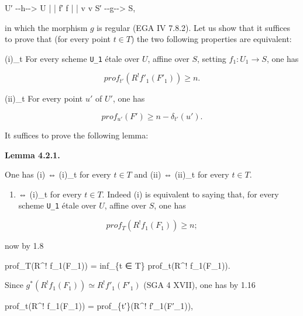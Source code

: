 \documentclass[
  11pt,
  a4paper,
]{book}
\newenvironment{Shaded}{}{}
\newcommand{\NormalTok}[1]{#1}
\providecommand{\tightlist}{%
  \setlength{\itemsep}{0pt}\setlength{\parskip}{0pt}}
\begin{document}
\begin{Shaded}
\begin{Highlighting}[]
\NormalTok{U′ {-}{-}h{-}{-}\textgreater{} U}
\NormalTok{|         |}
\NormalTok{f′        f}
\NormalTok{|         |}
\NormalTok{v         v}
\NormalTok{S′ {-}{-}g{-}{-}\textgreater{} S,}
\end{Highlighting}
\end{Shaded}

in which the morphism \(g\) is regular (EGA IV 7.8.2). Let us show that
it suffices to prove that (for every point \(t \in
T\)) the two following properties are equivalent:

(i)\_t For every scheme \texttt{U\_1} étale over \(U\), affine over
\(S\), setting \(f_{1} : U_{1} \to S\), one has

\[ prof_{t'}(R^{!} f'_{1}(F'_{1})) \geqslant n. \]

(ii)\_t For every point \(u'\) of \(U'\), one has

\[ prof_{u'}(F') \geqslant n - \delta_{t'}(u'). \]

It suffices to prove the following lemma:

\textbf{Lemma 4.2.1.}

One has (i) ⇔ (i)\_t for every \(t \in T\) and (ii) ⇔ (ii)\_t for every
\(t \in T\).

\begin{enumerate}
\def\labelenumi{(\roman{enumi})}
\tightlist
\item
  ⇔ (i)\_t for every \(t \in T\). Indeed (i) is equivalent to saying
  that, for every scheme \texttt{U\_1} étale over \(U\), affine over
  \(S\), one has
\end{enumerate}

\[ prof_{T}(R^{!} f_{1}(F_{1})) \geqslant n; \]

now by 1.8

\begin{Shaded}
\begin{Highlighting}[]
\NormalTok{prof\_T(R\^{}! f\_1(F\_1)) = inf\_\{t ∈ T\} prof\_t(R\^{}! f\_1(F\_1)).}
\end{Highlighting}
\end{Shaded}

Since \(g^{*}(R^{!} f_{1}(F_{1})) \simeq R^{!} f'_{1}(F'_{1})\) (SGA 4
XVII), one has by 1.16

\begin{Shaded}
\begin{Highlighting}[]
\NormalTok{prof\_t(R\^{}! f\_1(F\_1)) = prof\_\{t′\}(R\^{}! f′\_1(F′\_1)),}
\end{Highlighting}
\end{Shaded}
\end{document}
